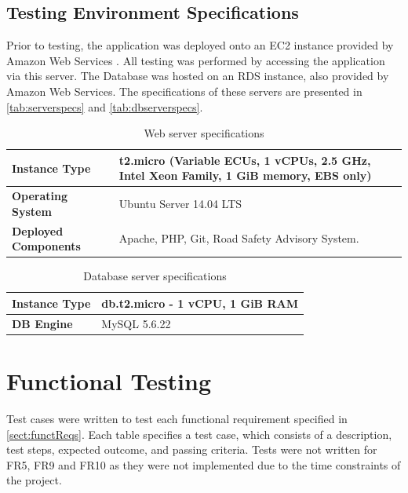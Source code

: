 \documentclass[authoryearcitations]{UoYCSproject}
\begin{document}
\subsection{Testing Environment Specifications}

Prior to testing, the application was deployed onto an EC2 instance provided by Amazon Web Services \citep{AmazonWebServices}. All testing was performed by accessing the application via this server. The Database was hosted on an RDS instance, also provided by Amazon Web Services. The specifications of these servers are presented in \autoref{tab:serverspecs} and \autoref{tab:dbserverspecs}.

\begin{table}
	\center
	\caption{Web server specifications}
	\label{tab:serverspecs}
	\begin{tabular}{| p{4cm} | p{9cm} |}
	\hline
	\textbf{Instance Type} & t2.micro (Variable ECUs, 1 vCPUs, 2.5 GHz, Intel Xeon Family, 1 GiB memory, EBS only) \\ \hline
	\textbf{Operating System} & Ubuntu Server 14.04 LTS \\ \hline
	\textbf{Deployed Components} & Apache, PHP, Git, Road Safety Advisory System. \\ \hline
	\end{tabular}
\end{table}

\begin{table}
	\center
	\caption{Database server specifications}
	\label{tab:dbserverspecs}
	\begin{tabular}{| p{4cm} | p{9cm} |}
	\hline
	\textbf{Instance Type} & db.t2.micro - 1 vCPU, 1 GiB RAM \\ \hline
	\textbf{DB Engine} & MySQL  5.6.22 \\ \hline
	\end{tabular}
\end{table}

\section{Functional Testing}

Test cases were written to test each functional requirement specified in \autoref{sect:functReqs}. Each table specifies a test case, which consists of a description, test steps, expected outcome, and passing criteria. Tests were not written for FR5, FR9 and FR10 as they were not implemented due to the time constraints of the project.
\end{document}

